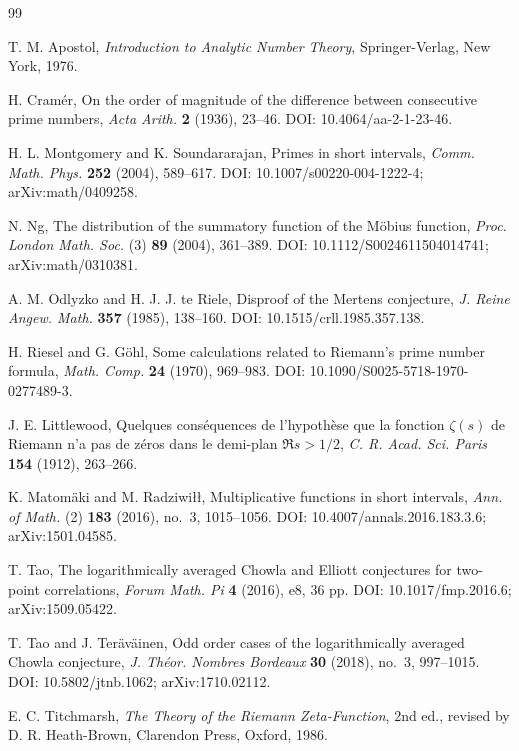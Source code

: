 \documentclass[11pt]{amsart}
\numberwithin{equation}{section}
\theoremstyle{plain}
\theoremstyle{definition}
\theoremstyle{remark}
\begin{document}
\begin{thebibliography}{99}
\label{sec:references}

T. M. Apostol,
\emph{Introduction to Analytic Number Theory},
Springer-Verlag, New York, 1976.

H. Cram\'er,
On the order of magnitude of the difference between consecutive prime numbers,
\emph{Acta Arith.} \textbf{2} (1936), 23--46.
DOI: 10.4064/aa-2-1-23-46.

H. L. Montgomery and K. Soundararajan,
Primes in short intervals,
\emph{Comm. Math. Phys.} \textbf{252} (2004), 589--617.
DOI: 10.1007/s00220-004-1222-4; arXiv:math/0409258.

N. Ng,
The distribution of the summatory function of the M\"obius function,
\emph{Proc. London Math. Soc.} (3) \textbf{89} (2004), 361--389.
DOI: 10.1112/S0024611504014741; arXiv:math/0310381.

A. M. Odlyzko and H. J. J. te Riele,
Disproof of the Mertens conjecture,
\emph{J. Reine Angew. Math.} \textbf{357} (1985), 138--160.
DOI: 10.1515/crll.1985.357.138.

H. Riesel and G. G\"ohl,
Some calculations related to Riemann's prime number formula,
\emph{Math. Comp.} \textbf{24} (1970), 969--983.
DOI: 10.1090/S0025-5718-1970-0277489-3.

J. E. Littlewood,
Quelques cons\'equences de l'hypoth\`ese que la fonction $\zeta(s)$ de Riemann
n'a pas de z\'eros dans le demi-plan $\Re s>1/2$,
\emph{C. R. Acad. Sci. Paris} \textbf{154} (1912), 263--266.

K. Matom\"aki and M. Radziwi\l\l,
Multiplicative functions in short intervals,
\emph{Ann. of Math.} (2) \textbf{183} (2016), no.~3, 1015--1056.
DOI: 10.4007/annals.2016.183.3.6; arXiv:1501.04585.

T. Tao,
The logarithmically averaged Chowla and Elliott conjectures for two-point correlations,
\emph{Forum Math. Pi} \textbf{4} (2016), e8, 36 pp.
DOI: 10.1017/fmp.2016.6; arXiv:1509.05422.

T. Tao and J. Ter\"av\"ainen,
Odd order cases of the logarithmically averaged Chowla conjecture,
\emph{J. Th\'eor. Nombres Bordeaux} \textbf{30} (2018), no.~3, 997--1015.
DOI: 10.5802/jtnb.1062; arXiv:1710.02112.

E. C. Titchmarsh,
\emph{The Theory of the Riemann Zeta-Function},
2nd ed., revised by D. R. Heath-Brown, Clarendon Press, Oxford, 1986.


\end{thebibliography}
\end{document}
